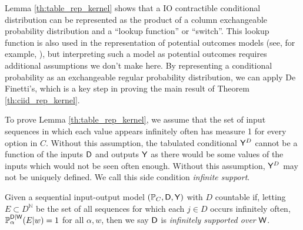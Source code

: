 Lemma \ref{th:table_rep_kernel} shows that a IO contractible conditional distribution can be represented as the product of a column exchangeable probability distribution and a ``lookup function'' or ``switch''. This lookup function is also used in the representation of potential outcomes models (see, for example, \citet{rubin_causal_2005}), but interpreting such a model as potential outcomes requires additional assumptions we don't make here. By representing a conditional probability as an exchangeable regular probability distribution, we can apply De Finetti's, which is a key step in proving the main result of Theorem \ref{th:ciid_rep_kernel}.

To prove Lemma \ref{th:table_rep_kernel}, we assume that the set of input sequences in which each value appears infinitely often has measure 1 for every option in $C$. Without this assumption, the tabulated conditional $\mathsf{Y}^D$ cannot be a function of the inputs $\mathsf{D}$ and outputs $\mathsf{Y}$ as there would be some values of the inputs which would not be seen often enough. Without this assumption, $\mathsf{Y}^D$ may not be uniquely defined. We call this side condition \emph{infinite support}.

\begin{definition}
Given a sequential input-output model $(\mathbb{P}_C,\mathsf{D},\mathsf{Y})$ with $D$ countable if, letting $E\subset D^{\mathbb{N}}$ be the set of all sequences for which each $j\in D$ occurs infinitely often, $\mathbb{P}_\alpha^{\mathsf{D}|\mathsf{W}}(E|w)=1$ for all $\alpha,w$, then we say $\mathsf{D}$ is \emph{infinitely supported over }$\mathsf{W}$.
\end{definition}



